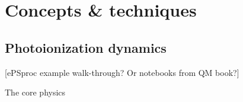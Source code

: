 \section{Concepts \& techniques}

\subsection{Photoionization dynamics} 
[ePSproc example walk-through? Or notebooks from QM book?]

The core physics 